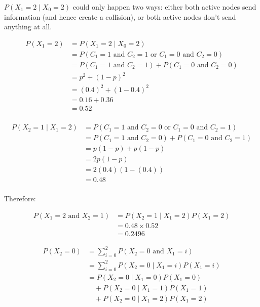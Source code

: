 \documentclass{amsart}
\theoremstyle{definition} %
\begin{document}
$P(X_{1} = 2 \mid X_{0} = 2)$ could only happen two ways: either both
active nodes send information (and hence create a collision), or both active
nodes don't send anything at all.

\begin{equation}
  \begin{aligned}
    P(X_{1} = 2) &= P(X_{1} = 2 \mid X_{0} = 2) \\
    &= P(C_{1} = 1 \text{ and } C_{2} = 1 \text{ or } C_{1} = 0 \text{ and } C_{2} = 0) \\
                 &= P(C_{1} = 1 \text{ and } C_{2} = 1) + P(C_{1} = 0 \text{ and } C_{2} = 0) \\
    &= p^2 + (1-p)^2 \\
    &= (0.4)^2 + (1-0.4)^2 \\
    &= 0.16 + 0.36 \\
    &= 0.52 \\
  \end{aligned}
\end{equation}

\begin{equation}
  \begin{aligned}
    P(X_{2} = 1 \mid X_{1} = 2) &= P(C_{1} = 1 \text{ and } C_{2} = 0 \text{ or } C_{1} = 0 \text{ and } C_{2} = 1) \\
    &= P(C_{1} = 1 \text{ and } C_{2} = 0) + P(C_{1} = 0 \text{ and } C_{2} =  1) \\
    &= p(1-p) + p(1-p) \\
    &= 2p(1-p) \\
    &= 2(0.4)(1-(0.4)) \\
    &= 0.48\\
  \end{aligned}
\end{equation}

Therefore:

\begin{equation}
  \begin{aligned}
    P(X_{1} = 2 \text{ and } X_{2} = 1) &= P(X_{2} = 1 \mid X_{1} = 2) P(X_{1} = 2) \\
    &= 0.48 \times 0.52 \\
    &= 0.2496
  \end{aligned}
\end{equation}


\begin{equation}
  \begin{aligned}
    P(X_2 = 0) &= \sum_{i=0}^{2} P(X_2 = 0 \text{ and } X_1 = i) \\
    &= \sum_{i=0}^{2} P(X_2 = 0 \mid X_1 = i)P(X_1 = i) \\
    &= P(X_2 = 0 \mid X_1 = 0)P(X_1 = 0) \\
    &\quad + P(X_2 = 0 \mid X_1 = 1)P(X_1 = 1) \\
    &\quad + P(X_2 = 0 \mid X_1 = 2)P(X_1 = 2) \\
  \end{aligned}
\end{equation}
\end{document}
